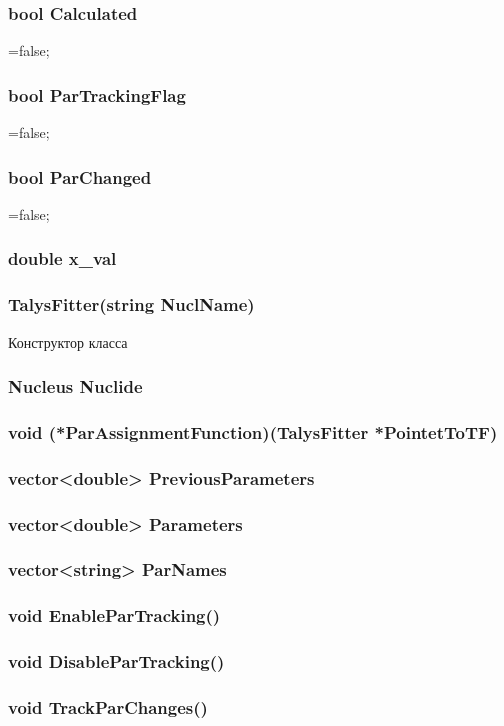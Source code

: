 \documentclass[a4paper,12pt]{extarticle}
\begin{document}
\subsubsection{bool Calculated}
=false;
\subsubsection{bool ParTrackingFlag}
=false;
\subsubsection{bool ParChanged}
=false;
\subsubsection{double x_val}

\subsubsection{TalysFitter(string NuclName)}
Конструктор класса
\subsubsection{Nucleus Nuclide}

\subsubsection{void (*ParAssignmentFunction)(TalysFitter *PointetToTF)}
\subsubsection{vector<double> PreviousParameters}
\subsubsection{vector<double> Parameters}
\subsubsection{vector<string> ParNames}
\subsubsection{void EnableParTracking()}
\subsubsection{void DisableParTracking()}
\subsubsection{void TrackParChanges()}
\end{document}
